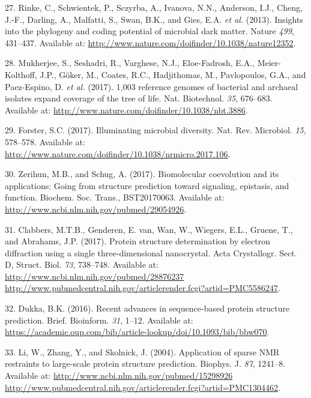 \documentclass[11pt,a4paper,twoside]{book}
\theoremstyle{definition}
\theoremstyle{definition}
\theoremstyle{remark}
\begin{document}
\hypertarget{ref-Rinke2013}{}
27. Rinke, C., Schwientek, P., Sczyrba, A., Ivanova, N.N., Anderson,
I.J., Cheng, J.-F., Darling, A., Malfatti, S., Swan, B.K., and Gies,
E.A. \emph{et al.} (2013). Insights into the phylogeny and coding
potential of microbial dark matter. Nature \emph{499}, 431--437.
Available at: \url{http://www.nature.com/doifinder/10.1038/nature12352}.

\hypertarget{ref-Mukherjee2017}{}
28. Mukherjee, S., Seshadri, R., Varghese, N.J., Eloe-Fadrosh, E.A.,
Meier-Kolthoff, J.P., Göker, M., Coates, R.C., Hadjithomas, M.,
Pavlopoulos, G.A., and Paez-Espino, D. \emph{et al.} (2017). 1,003
reference genomes of bacterial and archaeal isolates expand coverage of
the tree of life. Nat. Biotechnol. \emph{35}, 676--683. Available at:
\url{http://www.nature.com/doifinder/10.1038/nbt.3886}.

\hypertarget{ref-Forster2017}{}
29. Forster, S.C. (2017). Illuminating microbial diversity. Nat. Rev.
Microbiol. \emph{15}, 578--578. Available at:
\url{http://www.nature.com/doifinder/10.1038/nrmicro.2017.106}.

\hypertarget{ref-Zerihun2017}{}
30. Zerihun, M.B., and Schug, A. (2017). Biomolecular coevolution and
its applications: Going from structure prediction toward signaling,
epistasis, and function. Biochem. Soc. Trans., BST20170063. Available
at: \url{http://www.ncbi.nlm.nih.gov/pubmed/29054926}.

\hypertarget{ref-Clabbers2017}{}
31. Clabbers, M.T.B., Genderen, E. van, Wan, W., Wiegers, E.L., Gruene,
T., and Abrahams, J.P. (2017). Protein structure determination by
electron diffraction using a single three-dimensional nanocrystal. Acta
Crystallogr. Sect. D, Struct. Biol. \emph{73}, 738--748. Available at:
\href{http://www.ncbi.nlm.nih.gov/pubmed/28876237\%20http://www.pubmedcentral.nih.gov/articlerender.fcgi?artid=PMC5586247}{http://www.ncbi.nlm.nih.gov/pubmed/28876237 http://www.pubmedcentral.nih.gov/articlerender.fcgi?artid=PMC5586247}.

\hypertarget{ref-BKC2016}{}
32. Dukka, B.K. (2016). Recent advances in sequence-based protein
structure prediction. Brief. Bioinform. \emph{31}, 1--12. Available at:
\url{https://academic.oup.com/bib/article-lookup/doi/10.1093/bib/bbw070}.

\hypertarget{ref-Li2004}{}
33. Li, W., Zhang, Y., and Skolnick, J. (2004). Application of sparse
NMR restraints to large-scale protein structure prediction. Biophys. J.
\emph{87}, 1241--8. Available at:
\href{http://www.ncbi.nlm.nih.gov/pubmed/15298926\%20http://www.pubmedcentral.nih.gov/articlerender.fcgi?artid=PMC1304462}{http://www.ncbi.nlm.nih.gov/pubmed/15298926 http://www.pubmedcentral.nih.gov/articlerender.fcgi?artid=PMC1304462}.
\end{document}
